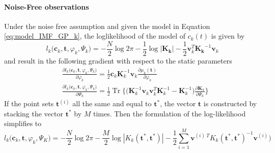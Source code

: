 \documentclass[article,moreauthors,pdftex,10pt,a4paper]{ssrn}
\DeclareMathOperator*{\tr}{\text{Tr}}
\begin{document}
\paragraph{Noise-Free observations}
Under the noise free assumption and given the model in Equation \eqref{eq:model_IMF_GP_k}, the loglikelihood of the model of $c_k(t)$ is given by
\begin{equation}
l_k\Big( \mathbf{c}_k, \mathbf{t}, \varphi_k, \Psi_k \Big) = - \frac{N}{2} \log 2 \pi - \frac{1}{2} \log |\mathbf{K_k} | - \frac{1}{2}\mathbf{v}_k^T \mathbf{K_k}^{-1} \mathbf{v}_k
\end{equation}
and result in the following gradient with respect to the static parameters 
\begin{align*}
& \frac{\partial l_k\Big( \mathbf{c}_k, \mathbf{t}, \varphi_k, \Psi_k \Big)}{\partial \varphi_k} = \frac{1}{2} \mathbf{c}_k \mathbf{K}_k^{-1} \mathbf{v}_k \frac{\partial \mu_k(\mathbf{t})}{\partial \varphi_k} \\
& \frac{\partial l_k\Big( \mathbf{c}_k, \mathbf{t}, \varphi_k, \Psi_k \Big)}{\partial \Psi_k} = \frac{1}{2} \tr \bigg\{\Big( \mathbf{K}_k^{-1}  \mathbf{v}_k \mathbf{v}_k^T\mathbf{K}_k^{-1} -\mathbf{K}_k^{-1}  \Big) \frac{\partial \mathbf{K}_k }{ \partial \Psi_k} \bigg\}
\end{align*}
If the point sets $\mathbf{t}^{(i)}$ all the same and equal to $\mathbf{t}^*$, the vector $\mathbf{t}$ is constructed by stacking the vector $\mathbf{t}^*$ by $M$ times. Then the formulation of the log-likelihood simplifies to 
\begin{equation}
l_k\Big( \mathbf{c}_k, \mathbf{t}, \varphi_k, \Psi_K \Big) = - \frac{N}{2} \log 2 \pi - \frac{M}{2} \log |K_k (\mathbf{t}^*,\mathbf{t}^*  ) | - \frac{1}{2}\sum_{i = 1}^M \mathbf{v}^{(i) \ T} K_k (\mathbf{t}^*,\mathbf{t} ^*) ^{-1} \mathbf{v}^{(i)} \big) 
\end{equation}
\end{document}
